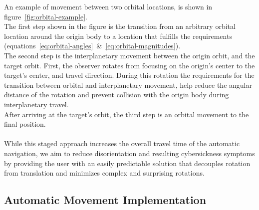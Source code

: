 An example of movement between two orbital locations, is shown in figure~\ref{fig:orbital-example}.
\\
The first step shown in the figure is the transition from an arbitrary orbital location around the origin body to a
location that fulfills the requirements (equations~\ref{eq:orbital-angles}~\&~\ref{eq:orbital-magnitudes}).
\\
The second step is the interplanetary movement between the origin orbit, and the target orbit.
First, the observer rotates from focusing on the origin's center to the target's center, and travel direction.
During this rotation the requirements for the transition between orbital and interplanetary movement, help reduce the
angular distance of the rotation and prevent collision with the origin body during interplanetary travel.
\\
After arriving at the target's orbit, the third step is an orbital movement to the final position.
\\
\\
While this staged approach increases the overall travel time of the automatic navigation, we aim to reduce
disorientation and resulting cybersickness symptoms by providing the user with an easily predictable solution that
decouples rotation from translation and minimizes complex and surprising rotations.


\subsection{Automatic Movement Implementation}\label{subsec:automatic-movement-implementation}

